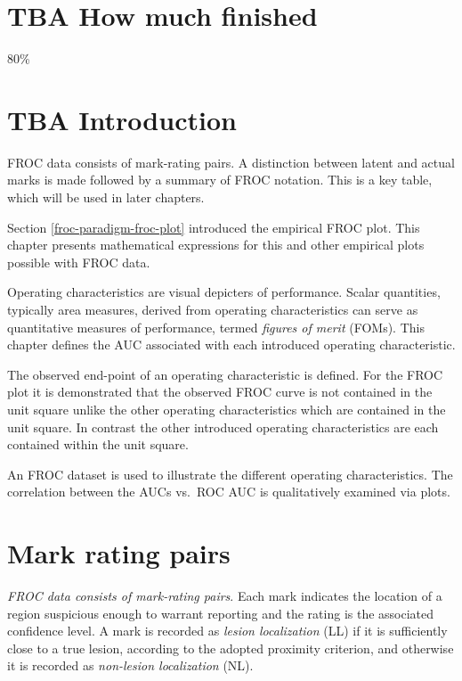 \documentclass[
]{book}
\begin{document}
\hypertarget{froc-empirical-how-much-finished}{%
\section{TBA How much finished}\label{froc-empirical-how-much-finished}}

80\%

\hypertarget{froc-empirical-intro}{%
\section{TBA Introduction}\label{froc-empirical-intro}}

FROC data consists of mark-rating pairs. A distinction between latent and actual marks is made followed by a summary of FROC notation. This is a key table, which will be used in later chapters.

Section \ref{froc-paradigm-froc-plot} introduced the empirical FROC plot. This chapter presents mathematical expressions for this and other empirical plots possible with FROC data.

Operating characteristics are visual depicters of performance. Scalar quantities, typically area measures, derived from operating characteristics can serve as quantitative measures of performance, termed \emph{figures of merit} (FOMs). This chapter defines the AUC associated with each introduced operating characteristic.

The observed end-point of an operating characteristic is defined. For the FROC plot it is demonstrated that the observed FROC curve is not contained in the unit square unlike the other operating characteristics which are contained in the unit square. In contrast the other introduced operating characteristics are each contained within the unit square.

An FROC dataset is used to illustrate the different operating characteristics. The correlation between the AUCs vs.~ROC AUC is qualitatively examined via plots.

\hypertarget{froc-empirical-mark-rating-pairs}{%
\section{Mark rating pairs}\label{froc-empirical-mark-rating-pairs}}

\emph{FROC data consists of mark-rating pairs}. Each mark indicates the location of a region suspicious enough to warrant reporting and the rating is the associated confidence level. A mark is recorded as \emph{lesion localization} (LL) if it is sufficiently close to a true lesion, according to the adopted proximity criterion, and otherwise it is recorded as \emph{non-lesion localization} (NL).
\end{document}
